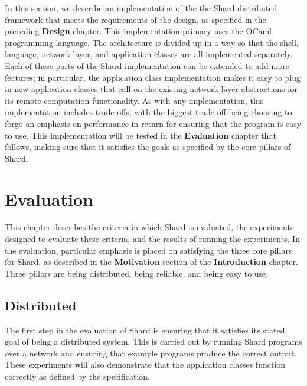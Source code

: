 \documentclass[oneside]{report}
\begin{document}
In this section, we describe an implementation of the the Shard distributed framework that meets the requirements of the design, as specified in the preceding \textbf{Design} chapter.
This implementation primary uses the OCaml programming language.
The architecture is divided up in a way so that the shell, language, network layer, and application classes are all implemented separately.
Each of these parts of the Shard implementation can be extended to add more features; in particular, the application class implementation makes it easy to plug in new application classes that call on the existing network layer abstractions for its remote computation functionality.
As with any implementation, this implementation includes trade-offs, with the biggest trade-off being choosing to forgo an emphasis on performance in return for ensuring that the program is easy to use.
This implementation will be tested in the \textbf{Evaluation} chapter that follows, making sure that it satisfies the goals as specified by the core pillars of Shard.


\chapter{Evaluation}

This chapter describes the criteria in which Shard is evaluated, the experiments designed to evaluate these criteria, and the results of running the experiments.
In the evaluation, particular emphasis is placed on satisfying the three core pillars for Shard, as described in the \textbf{Motivation} section of the \textbf{Introduction} chapter.
Three pillars are being distributed, being reliable, and being easy to use.

\section{Distributed}

The first step in the evaluation of Shard is ensuring that it satisfies its stated goal of being a distributed system.
This is carried out by running Shard programs over a network and ensuring that example programs produce the correct output.
These experiments will also demonstrate that the application classes function correctly as defined by the specification.
\end{document}
